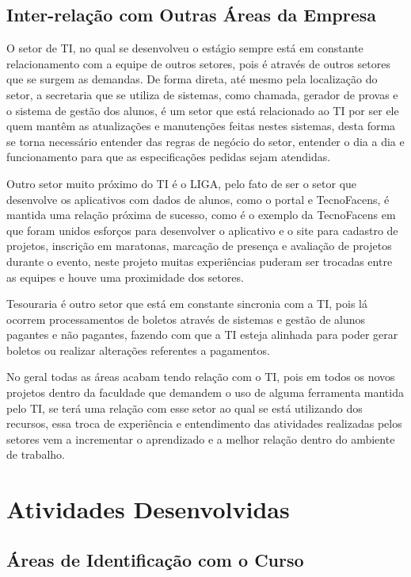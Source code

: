 \documentclass[
	12pt,				%
	oneside,			%
	a4paper,			%
	chapter=TITLE,		%
	section=TITLE,		%
	sumario=tradicional %
	english,			%
	french,				%
	spanish,			%
	brazil				%
	]{abntex2}
\begin{document}
\section{Inter-relação com Outras Áreas da Empresa}
\label{sec:relacaoareas}

O setor de TI, no qual se desenvolveu o estágio sempre está em constante relacionamento com a equipe de outros setores, pois é através de outros setores que se surgem as demandas. De forma direta, até mesmo pela localização do setor, a secretaria que se utiliza de sistemas, como chamada, gerador de provas e o sistema de gestão dos alunos, é um setor que está relacionado ao TI por ser ele quem mantêm as atualizações e manutenções feitas nestes sistemas, desta forma se torna necessário entender das regras de negócio do setor, entender o dia a dia e funcionamento para que as especificações pedidas sejam atendidas.

Outro setor muito próximo do TI é o LIGA, pelo fato de ser o setor que desenvolve os aplicativos com dados de alunos, como o portal e TecnoFacens, é mantida uma relação próxima de sucesso, como é o exemplo da TecnoFacens em que foram unidos esforços para desenvolver o aplicativo e o site para cadastro de projetos, inscrição em maratonas, marcação de presença e avaliação de projetos durante o evento, neste projeto muitas experiências puderam ser trocadas entre as equipes e houve uma proximidade dos setores.

Tesouraria é outro setor que está em constante sincronia com a TI, pois lá ocorrem processamentos de boletos através de sistemas e gestão de alunos pagantes e não pagantes, fazendo com que a TI esteja alinhada para poder gerar boletos ou realizar alterações referentes a pagamentos.

No geral todas as áreas acabam tendo relação com o TI, pois em todos os novos projetos dentro da faculdade que demandem o uso de alguma ferramenta mantida pelo TI, se terá uma relação com esse setor ao qual se está utilizando dos recursos, essa troca de experiência e entendimento das atividades realizadas pelos setores vem a incrementar o aprendizado e a melhor relação dentro do ambiente de trabalho. 

\chapter{Atividades Desenvolvidas}
\label{chap:chap5}

\section{Áreas de Identificação com o Curso}
\label{sec:identcurso}
\end{document}
